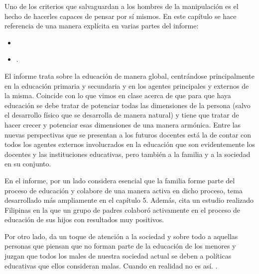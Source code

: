 Uno de los criterios que salvaguardan a los hombres de la manipulación es el hecho de hacerles capaces de pensar por sí mismos.
%
En este capítulo se hace referencia de una manera explícita en varias partes del informe:

\begin{itemize}
\item {}
\item {}.
\end{itemize}



El informe trata sobre la educación de manera global, centrándose principalmente en la educación primaria y secundaria y en los agentes principales y externos de la misma.
%
Coincide con lo que vimos en clase acerca de que para que haya educación se debe tratar de potenciar todas las dimensiones de la persona (salvo el desarrollo físico que se desarrolla de manera natural) y tiene que tratar de hacer crecer y potenciar esas dimensiones de una manera armónica.
%
Entre las nuevas perspectivas que se presentan a los futuros docentes está la de contar con todos los agentes externos involucrados en la educación que son evidentemente los docentes y las instituciones educativas, pero también a la familia y a la sociedad en su conjunto.
%

En el informe, por un lado considera esencial que la familia forme parte del proceso de educación y colabore de una manera activa en dicho proceso, tema desarrollado más ampliamente en el capítulo 5.
%
Además, cita un estudio realizado Filipinas en la que un grupo de padres colaboró activamente en el proceso de educación de sus hijos con resultados muy positivos.

Por otro lado, da un toque de atención a la sociedad y sobre todo a aquellas personas que piensan que no forman parte de la educación de los menores y juzgan que todos los males de nuestra sociedad actual se deben a políticas educativas que ellos consideran malas.
%
Cuando en realidad no es así.
%
.
%
